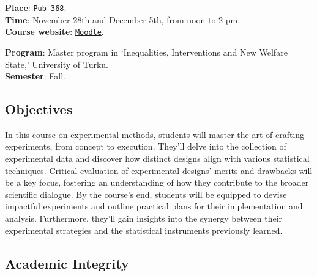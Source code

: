 \documentclass[letterpaper]{article}
\begin{document}
{\bf Place}: \texttt{Pub-368}.\\
{\bf Time}: November 28th and December 5th, from noon to 2 pm.\\

{\bf Course website}: \href{https://moodle.utu.fi/course/view.php?id=26195}{\texttt{Moodle}}.




{\bf Program}: Master program in `Inequalities, Interventions and New Welfare State,' University of Turku.\\
{\bf Semester}: Fall.\\





\subsection*{Objectives}

In this course on experimental methods, students will master the art of crafting experiments, from concept to execution. They'll delve into the collection of experimental data and discover how distinct designs align with various statistical techniques. Critical evaluation of experimental designs' merits and drawbacks will be a key focus, fostering an understanding of how they contribute to the broader scientific dialogue. By the course's end, students will be equipped to devise impactful experiments and outline practical plans for their implementation and analysis. Furthermore, they'll gain insights into the synergy between their experimental strategies and the statistical instruments previously learned.


\subsection*{Academic Integrity}
\end{document}
